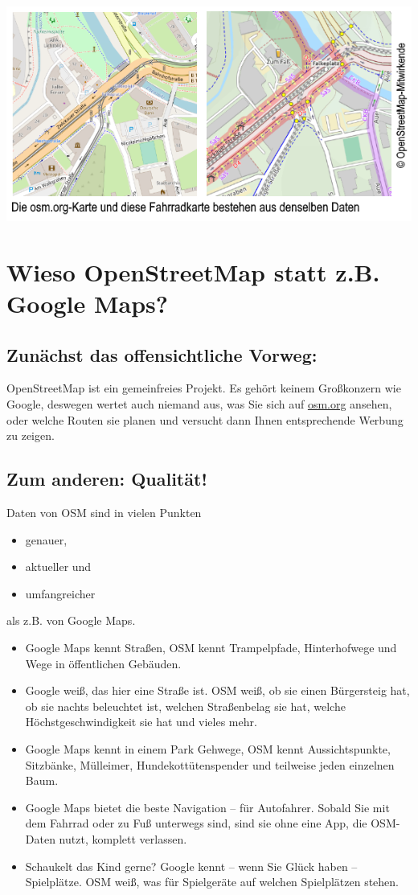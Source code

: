 \documentclass[10pt,foldmark,notumble]{leaflet}
\newcommand{\myhy}[1]{{\color{blue}\setulcolor{blue}\ul{#1}}}
\begin{document}
    \includegraphics[width=\linewidth]{karte.png}


    \section{Wieso OpenStreetMap statt z.B. Google Maps?}
    \subsection{Zunächst das offensichtliche Vorweg:}
    OpenStreetMap ist ein gemeinfreies Projekt.
    Es gehört keinem Großkonzern wie Google, deswegen wertet auch niemand aus, was Sie sich auf \myhy{osm.org} ansehen, oder welche Routen sie planen und versucht dann Ihnen entsprechende Werbung zu zeigen.

    \subsection{Zum anderen: Qualität!}
    Daten von OSM sind in vielen Punkten
    \begin{itemize}[noitemsep,topsep=0pt]
        \item genauer,
        \item aktueller und
        \item umfangreicher
    \end{itemize}
    als z.B. von Google Maps.

    \begin{itemize}[noitemsep,topsep=0pt]
        \item Google Maps kennt Straßen, OSM kennt Trampelpfade, Hinterhofwege und Wege in öffentlichen Gebäuden.
        \item Google weiß, das hier eine Straße ist.
        OSM weiß, ob sie einen Bürgersteig hat, ob sie nachts beleuchtet ist, welchen Straßenbelag sie hat, welche Höchstgeschwindigkeit sie hat und vieles mehr.
        \item Google Maps kennt in einem Park Gehwege, OSM kennt Aussichtspunkte, Sitzbänke, Mülleimer, Hundekottütenspender und teilweise jeden einzelnen Baum.
        \item Google Maps bietet die beste Navigation -- für Autofahrer.
        Sobald Sie mit dem Fahrrad oder zu Fuß unterwegs sind, sind sie ohne eine App, die OSM-Daten nutzt, komplett verlassen.
        \item Schaukelt das Kind gerne? Google kennt -- wenn Sie Glück haben -- Spielplätze.
        OSM weiß, was für Spielgeräte auf welchen Spielplätzen stehen.
    \end{itemize}
\end{document}
